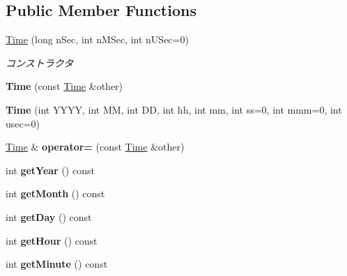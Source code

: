 \subsection*{Public Member Functions}
\begin{DoxyCompactItemize}
\item 
\hyperlink{classskl_1_1_time_acaa93bb22917f383bd74ea58ba1ae6e6}{Time} (long n\+Sec, int n\+M\+Sec, int n\+U\+Sec=0)
\begin{DoxyCompactList}\small\item\em コンストラクタ \end{DoxyCompactList}\item 
\hypertarget{classskl_1_1_time_a0408b1fdca0d7f086a8901e8594294bd}{}\label{classskl_1_1_time_a0408b1fdca0d7f086a8901e8594294bd} 
{\bfseries Time} (const \hyperlink{classskl_1_1_time}{Time} \&other)
\item 
\hypertarget{classskl_1_1_time_a48bd8879a40202da5d2186f463c1fde8}{}\label{classskl_1_1_time_a48bd8879a40202da5d2186f463c1fde8} 
{\bfseries Time} (int Y\+Y\+YY, int MM, int DD, int hh, int mm, int ss=0, int mmm=0, int usec=0)
\item 
\hypertarget{classskl_1_1_time_aa2ac2ed4b34fba1f6aadc09481601c77}{}\label{classskl_1_1_time_aa2ac2ed4b34fba1f6aadc09481601c77} 
\hyperlink{classskl_1_1_time}{Time} \& {\bfseries operator=} (const \hyperlink{classskl_1_1_time}{Time} \&other)
\item 
\hypertarget{classskl_1_1_time_aa4d8bd52002f3ca8bbbae51ebfdbc5ba}{}\label{classskl_1_1_time_aa4d8bd52002f3ca8bbbae51ebfdbc5ba} 
int {\bfseries get\+Year} () const
\item 
\hypertarget{classskl_1_1_time_ab7c2d4943a54151c9774a8bd704c3225}{}\label{classskl_1_1_time_ab7c2d4943a54151c9774a8bd704c3225} 
int {\bfseries get\+Month} () const
\item 
\hypertarget{classskl_1_1_time_af3982a0a799c7bf72483f837a1e1f799}{}\label{classskl_1_1_time_af3982a0a799c7bf72483f837a1e1f799} 
int {\bfseries get\+Day} () const
\item 
\hypertarget{classskl_1_1_time_a197e9349622b1daa36584b75e0642110}{}\label{classskl_1_1_time_a197e9349622b1daa36584b75e0642110} 
int {\bfseries get\+Hour} () const
\item 
\hypertarget{classskl_1_1_time_aecfe6ed53802a6db895473f6ddd514b0}{}\label{classskl_1_1_time_aecfe6ed53802a6db895473f6ddd514b0} 
int {\bfseries get\+Minute} () const
\item 
\hypertarget{classskl_1_1_time_a650a587f6499a627666d590b13dd3756}{}\label{classskl_1_1_time_a650a587f6499a627666d590b13dd3756} 

\end{DoxyCompactItemize}
